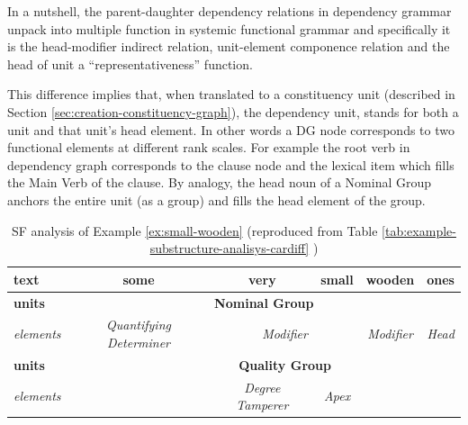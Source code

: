 In a nutshell, the parent-daughter dependency relations in dependency grammar unpack into multiple function in systemic functional grammar and specifically it is the head-modifier indirect relation, unit-element componence relation and the head of unit a ``representativeness'' function. 

This difference implies that, when translated to a constituency unit (described in Section \ref{sec:creation-constituency-graph}), the dependency unit, stands for both a unit and that unit's head element. In other words a DG node corresponds to two functional elements at different rank scales. For example the root verb in dependency graph corresponds to the clause node and the lexical item which fills the Main Verb of the clause. By analogy, the head noun of a Nominal Group anchors the entire unit (as a group) and fills the head element of the group. 

\begin{table}[ht]
	\centering
	\begin{tabular}{|l|c|c|ccc}
		\hline
		\textbf{text}              & \textbf{some}                            & \textbf{very}                     & \multicolumn{1}{c|}{\textbf{small}} & \multicolumn{1}{c|}{\textbf{wooden}}            & \multicolumn{1}{c|}{\textbf{ones}}          \\ \hline
		\textbf{units}    & \multicolumn{5}{c|}{\textbf{Nominal Group}}                                                                                                                           \\ \hline
		\textit{elements} & \textit{Quantifying Determiner} & \multicolumn{2}{c|}{\textit{Modifier}}                & \multicolumn{1}{c|}{\textit{Modifier}} & \multicolumn{1}{c|}{\textit{Head}} \\ \hline
		\textbf{units}    &                                 & \multicolumn{2}{c|}{\textbf{Quality Group}}           & \multicolumn{2}{c}{\multirow{2}{*}{}}                                       \\ \cline{1-1} \cline{3-4}
		\textit{elements} &                                 & \textit{Degree Tamperer} & \textit{Apex}              & \multicolumn{2}{c}{}                   \\ \cline{1-1} \cline{3-4}
	\end{tabular}
	
	
	\caption{SF analysis of Example \ref{ex:small-wooden} (reproduced from Table \ref{tab:example-substructure-analisys-cardiff} )}
	\label{tab:example-substructure-analisys-cardiff-repeated}
\end{table}

